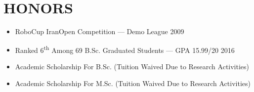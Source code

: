 \documentclass[10pt,a4paper,sans]{moderncv} %
\begin{document}
	\vspace{-1em}
	
	\section{HONORS}
	
	\begin{itemize}[nosep]
	    \item RoboCup IranOpen Competition --- Demo League \hfill 2009
		\item Ranked 6\textsuperscript{th} Among 69 B.Sc. Graduated Students --- GPA 15.99/20 \hfill 2016
		\item Academic Scholarship For B.Sc. (Tuition Waived Due to Research Activities)
		\item Academic Scholarship For M.Sc. (Tuition Waived Due to Research Activities)
	\end{itemize}
    
	
	\vspace{-1em}
   
	
\end{document}
